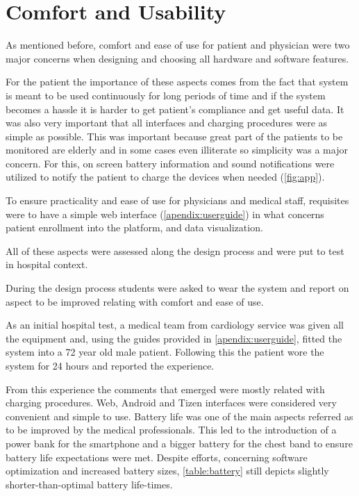 \FloatBarrier

\section{Comfort and Usability}

As mentioned before, comfort and ease of use for patient and physician were two major concerns when designing and choosing all hardware and software features.

For the patient the importance of these aspects comes from the fact that system is meant to be used continuously for long periods of time and if the system becomes a hassle it is harder to get patient's compliance and get useful data. It was also very important that all interfaces and charging procedures were as simple as possible. This was important because great part of the patients to be monitored are elderly and in some cases even illiterate so simplicity was a major concern. For this, on screen battery information and sound notifications were utilized to notify the patient to charge the devices when needed (\cref{fig:app}).

To ensure practicality and ease of use for physicians and medical staff, requisites were to have a simple web interface (\cref{apendix:userguide}) in what concerns patient enrollment into the platform, and data visualization.

All of these aspects were assessed along the design process and were put to test in hospital context. 

During the design process students were asked to wear the system and report on aspect to be improved relating with comfort and ease of use.

As an initial hospital test, a medical team from cardiology service was given all the equipment and, using the guides provided in \cref{apendix:userguide}, fitted the system into a 72 year old male patient. Following this the patient wore the system for 24 hours and reported the experience.

From this experience the comments that emerged were mostly related with charging procedures. Web, Android and Tizen interfaces were considered very convenient and simple to use. Battery life was one of the main aspects referred as to be improved by the medical professionals. This led to the introduction of a power bank for the smartphone and a bigger battery for the chest band to ensure battery life expectations were met. Despite efforts, concerning software optimization and increased battery sizes, \cref{table:battery} still depicts slightly shorter-than-optimal battery life-times.

